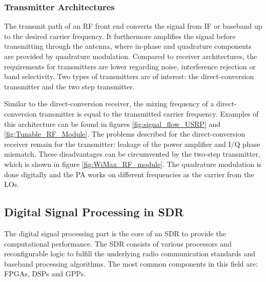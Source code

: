 \subsubsection{Transmitter Architectures}
The transmit path of an RF front end converts the signal from \ac{IF} or baseband up to the desired carrier frequency. It furthermore amplifies the signal before transmitting through the antenna, where in-phase and quadrature components are provided by quadrature modulation. Compared to receiver architectures, the requirements for transmitters are lower regarding noise, interference rejection or band selectivity. Two types of transmitters are of interest: the direct-conversion transmitter and the two step transmitter.

Similar to the direct-conversion receiver, the mixing frequency of a direct-conversion transmitter is equal to the transmitted carrier frequency. Examples of this architecture can be found in figures \ref{fig:signal_flow_USRP} and \ref{fig:Tunable_RF_Module}. The problems described for the direct-conversion receiver remain for the transmitter: leakage of the power amplifier and I/Q phase mismatch. These disadvantages can be circumvented by the two-step transmitter, which is shown in figure \ref{fig:WiMax_RF_module}. The quadrature modulation is done digitally and the \ac{PA} works on different frequencies as the carrier from the \acp{LO}.

\subsection{Digital Signal Processing in SDR}
\label{sec:dsp_sdr}
The digital signal processing part is the core of an \ac{SDR} to provide the computational performance. The SDR consists of various processors and reconfigurable logic to fulfill the underlying radio communication standards and baseband processing algorithms. The most common components in this field are: FPGAs, DSPs and GPPs.


